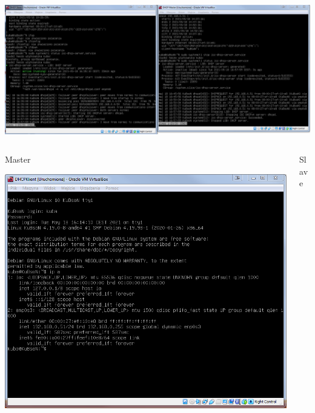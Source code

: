 \documentclass[presentation]{beamer}
\begin{document}
\begin{frame}[label={sec:orga3a1c21}]{}
\begin{center}
\includegraphics[width=.9\linewidth]{./data/dhcp/10_slave.png}
\end{center}
\end{frame}
\begin{frame}[label={sec:orgb1c5858}]{}
\begin{columns}
\begin{column}{0.55\columnwidth}
\begin{block}{Master}
\begin{center}
\includegraphics[width=.9\linewidth]{./data/dhcp/11_master.png}
\end{center}
\end{block}
\end{column}
\begin{column}{0.55\columnwidth}
\begin{block}{Slave}
\begin{center}

\end{center}
\end{block}
\end{column}
\end{columns}
\end{frame}
\end{document}

